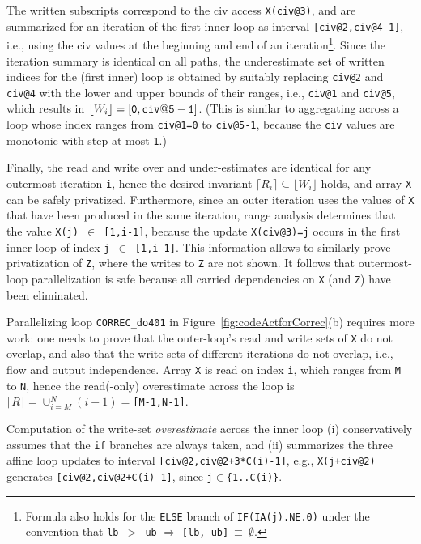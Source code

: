\documentclass{sig-alternate}
\begin{document}
%
The written subscripts correspond to the {\sc civ} access {\tt X(civ@3)}, %
and are summarized for an iteration of the first-inner loop as
interval  {\tt[civ@2,civ@4-1]}, i.e., using the {\sc civ} values at 
the beginning and end of an iteration\footnote{Formula also holds 
for the {\tt ELSE} branch of {\tt IF(IA(j).NE.0)} under the convention 
that {\tt lb $>$ ub} $\Rightarrow$ {\tt [lb, ub]}$\ \equiv \ \emptyset$.}.
%
Since the iteration summary is identical on all paths,
the underestimate set of written indices for the (first inner) loop 
is obtained by suitably replacing {\tt civ@2} and {\tt civ@4} with 
the lower and upper bounds of their ranges, i.e., {\tt civ@1} and 
{\tt civ@5}, which results in $\lfloor W_i\rfloor={\tt [0,civ@5-1]}$.
(This is similar to aggregating across a loop whose index ranges 
    from {\tt{}civ@1=0} to {\tt{}civ@5-1}, because the {\tt civ} 
    values are monotonic with step at most {\tt 1}.)

Finally, the read and write over and under-estimates are identical 
for any outermost iteration {\tt i}, hence the desired invariant 
$\lceil R_i\rceil \subseteq \lfloor W_i\rfloor$ holds, and array {\tt X} 
can be safely privatized. 
%
Furthermore, since an outer iteration uses the values of {\tt X} that 
have been produced in the same iteration, range analysis determines that 
the value {\tt X(j) $\in$ [1,i-1]}, because the update 
{\tt X(civ@3)=j} occurs in the first inner loop of index {\tt j $\in$ [1,i-1]}. 
%
This information allows to similarly prove privatization 
of {\tt Z}, where the writes to {\tt Z} are not shown.
%
It follows that outermost-loop parallelization is safe because 
all carried dependencies on {\tt X} (and {\tt Z}) have been eliminated.

\vspace{1ex}
Parallelizing loop {\tt CORREC\_do401} in Figure~\ref{fig:codeActforCorrec}(b) 
requires more work: one needs to prove that the outer-loop's read and write 
sets of {\tt X} do not overlap, and also that the write sets of  
different iterations do not overlap, i.e., flow and output independence. 
Array {\tt X} is read on index {\tt i}, which ranges from {\tt M} to {\tt N},
hence the read(-only) overestimate across the loop is 
{\tt$\lceil R \rceil =\cup_{i=M}^{N}(i-1)=$[M-1,N-1]}.


Computation of the write-set {\em overestimate} across the inner loop 
(i)  conservatively assumes that the {\tt if} branches are always taken, and
(ii) summarizes the three affine loop updates 
to interval {\tt[civ@2,civ@2+3*C(i)-1]},
e.g., {\tt X(j+civ@2)} generates {\tt[civ@2,civ@2+C(i)-1]}, since  
{\tt j$\in$\{1..C(i)\}}.
\end{document}
